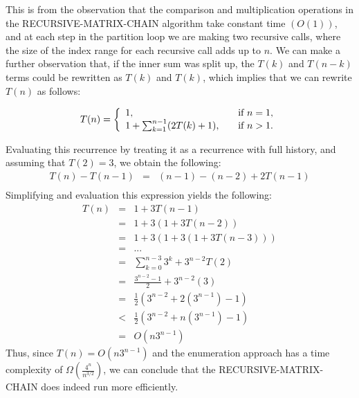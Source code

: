 \documentclass[11pt]{article}
\begin{document}
\begin{sol}
This is from the observation that the comparison and multiplication operations in the RECURSIVE-MATRIX-CHAIN algorithm take constant time $(O(1))$, and at each step in the partition loop we are making two recursive calls, where the size of the index range for each recursive call adds up to $n$. We can make a further observation that, if the inner sum was split up, the $T(k)$ and $T(n-k)$ terms could be rewritten as $T(k)$ and $T(k)$, which implies that we can rewrite $T(n)$ as follows:

\[
T(n) = \left\{ 
  \begin{array}{l l}
    1, & \quad \text{if $n = 1$}, \\
    1 + \sum_{k=1}^{n-1}(2T(k) + 1), & \quad \text{if $n > 1$}. \\
  \end{array} \right.
\]

Evaluating this recurrence by treating it as a recurrence with full history, and assuming that $T(2) = 3$, we obtain the following:
\begin{eqnarray*}
T(n) - T(n - 1) & = & (n - 1) - (n - 2) + 2T(n-1) \\
\end{eqnarray*}
Simplifying and evaluation this expression yields the following:
\begin{eqnarray*}
T(n) & = & 1 + 3T(n-1) \\
& = & 1 + 3(1 + 3T(n-2)) \\
& = & 1 + 3(1 + 3(1 + 3T(n-3))) \\
& = & ... \\
& = & \sum_{k=0}^{n-3}3^k + 3^{n-2}T(2) \\
& = & \frac{3^{n-2} - 1}{2} + 3^{n-2}(3) \\
& = & \frac{1}{2}(3^{n-2} + 2(3^{n-1}) - 1) \\
& < & \frac{1}{2}(3^{n-2} + n(3^{n-1}) - 1) \\
& = & O(n3^{n-1})
\end{eqnarray*}
Thus, since $T(n) = O(n3^{n-1})$ and the enumeration approach has a time complexity of $\Omega(\frac{4^n}{n^{3/2}})$, we can conclude that the RECURSIVE-MATRIX-CHAIN does indeed run more efficiently. 
\end{sol}
\end{document}
